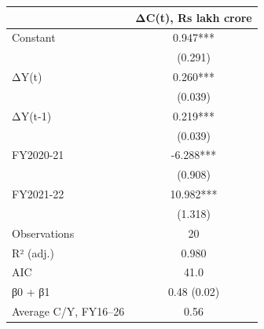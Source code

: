 \begin{tabular}{lc}
\toprule
 & ΔC(t), Rs lakh crore \\
\midrule
Constant & 0.947*** \\
   & (0.291) \\
ΔY(t) & 0.260*** \\
     & (0.039) \\
ΔY(t-1) & 0.219*** \\
       & (0.039) \\
FY2020-21 & -6.288*** \\
         & (0.908) \\
FY2021-22 & 10.982*** \\
           & (1.318) \\
Observations & 20 \\
R² (adj.) & 0.980 \\
AIC & 41.0 \\
β0 + β1 & 0.48 (0.02) \\
Average C/Y, FY16–26 & 0.56 \\
\bottomrule
\end{tabular}
